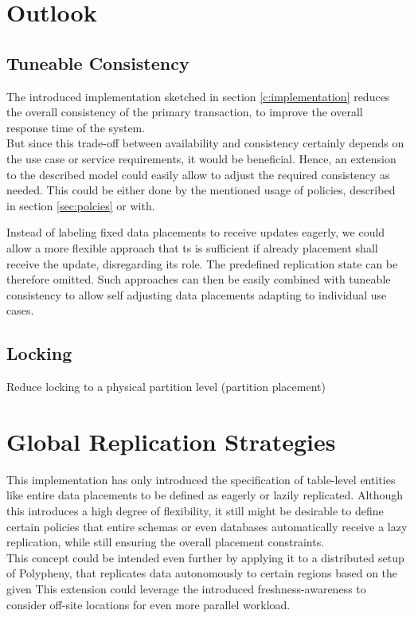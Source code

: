 
\section{Outlook}

\subsection{Tuneable Consistency}
The introduced implementation sketched in section \ref{c:implementation} reduces the overall consistency of the primary transaction,
to improve the overall response time of the system.\\ 
But since this trade-off between availability and consistency certainly depends on the use case or service requirements, it would be beneficial.
Hence, an extension to the described model could easily allow to adjust the required consistency as needed. 
This could be either done by the mentioned usage of policies, described in section \ref{sec:polcies} or with.

Instead of labeling fixed data placements to receive updates eagerly, we could allow a more flexible approach that ts is sufficient if already placement 
shall receive the update, disregarding its role. The predefined replication state can be therefore omitted. 
Such approaches can then be easily combined with tuneable consistency to allow self adjusting data placements  adapting to individual use cases.

\subsection{Locking}
Reduce locking to a physical partition level  (partition placement)





\tocless\section{Global Replication Strategies}
This implementation has only introduced the specification of table-level entities like entire data placements to be defined as eagerly or lazily replicated.
Although this introduces a high degree of flexibility, it still might be desirable to define certain policies that entire schemas or even databases automatically 
receive a lazy replication, while still ensuring the overall placement constraints.\\
This concept could be intended even further by applying it to a distributed setup of Polypheny, that replicates data autonomously to certain regions based on the given 
This extension could leverage the introduced freshness-awareness to consider off-site locations for even more parallel workload.


